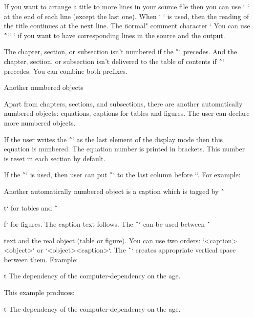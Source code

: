 If you want to arrange a title to more lines in your source file then you can
use `^^J` at the end of each line (except the last one).
When `^^J` is used, then the reading of the title continues at the next line.
The \"normal" comment character `%
You can use \^`\nl`{\visiblesp` ^^J`} if you want to have corresponding lines in the source
and the output.

The chapter, section, or subsection isn't numbered if the \^`\nonum` precedes.
And the chapter, section, or subsection isn't delivered to the table of
contents if \^`\notoc` precedes. You can combine both prefixes.

\secc[cap] Another numbered objects

Apart from chapters, sections, and subsections, there are another
automatically numbered objects: equations, captions for tables and
figures. The user can declare more numbered objects.

If the user writes the \^`\eqmark` as the last element of the display mode then
this equation is numbered. The equation number is printed in brackets. This number
is reset in each section by default.

If the \^`\eqalignno` is used, then user can put \^`\eqmark` to the last column
before `\cr`. For example:

\begtt
{}
\endtt

Another automatically numbered object is a caption which is tagged by \^`\caption/t` for
tables and \^`\caption/f` for figures. The caption text follows.
The \^`\cskip` can be used between \^`\caption` text and the real object (table
or figure). You can use two orders: `<caption>\cskip <object>` or
`<object>\cskip <caption>`.
The \^`\cskip` creates appropriate vertical space between them. Example:

\begtt
\caption/t The dependency of the computer-dependency on the age.
\cskip
\noindent\hfil{}
\endtt

This example produces:

\medskip
\caption/t The dependency of the computer-dependency on the age.
\cskip
\noindent\hfil{}
\medskip

